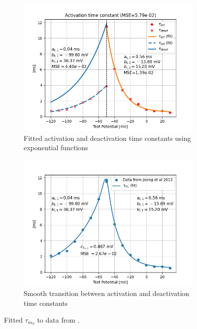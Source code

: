 \documentclass[../../workflow.tex]{subfiles}
\begin{document}
\begin{figure}[H]
    \centering
    \begin{subfigure}[t]{0.45\textwidth}
        \centering
        \includegraphics[width=\textwidth]{./img/t_type_calcium_channel/final_tau_activation_fit.png}
        \caption{Fitted activation and deactivation time constants using exponential functions}
        \label{fig:data_fitted_taus_from_jeong_activation}
    \end{subfigure}
    \hfill
    \begin{subfigure}[t]{0.45\textwidth}
        \centering
        \includegraphics[width=\textwidth]{./img/t_type_calcium_channel/tau_activation_join_exponentials.png}
        \caption{Smooth transition between activation and deactivation time constants}
        \label{fig:data_fitted_tau_m_from_jeong_smooth_transition}
    \end{subfigure}
    
    \caption{Fitted $\tau_{m_T}$ to data from \cite{jeongCaa1TFlyTtype2015}.}
    \label{fig:data_fitted_taus_from_jeong}
\end{figure}
\end{document}
